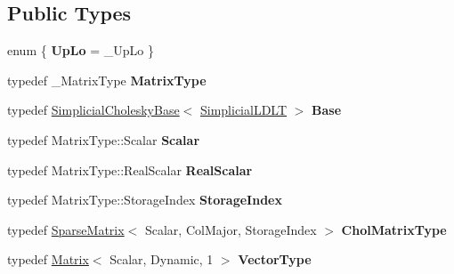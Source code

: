 \subsection*{Public Types}
\begin{DoxyCompactItemize}
\item 
\mbox{\label{class_eigen_1_1_simplicial_l_d_l_t_af38a3d21ce43cfccc068374e98404c4f}} 
enum \{ {\bfseries Up\+Lo} = \+\_\+\+Up\+Lo
 \}
\item 
\mbox{\label{class_eigen_1_1_simplicial_l_d_l_t_a75c4a9713dc57cea09c05185a93398b6}} 
typedef \+\_\+\+Matrix\+Type {\bfseries Matrix\+Type}
\item 
\mbox{\label{class_eigen_1_1_simplicial_l_d_l_t_a80564e6741d039a3b7b2b71a96639678}} 
typedef \mbox{\hyperlink{class_eigen_1_1_simplicial_cholesky_base}{Simplicial\+Cholesky\+Base}}$<$ \mbox{\hyperlink{class_eigen_1_1_simplicial_l_d_l_t}{Simplicial\+L\+D\+LT}} $>$ {\bfseries Base}
\item 
\mbox{\label{class_eigen_1_1_simplicial_l_d_l_t_a95c4c66916a223d1b9ab67ef1f40ddea}} 
typedef Matrix\+Type\+::\+Scalar {\bfseries Scalar}
\item 
\mbox{\label{class_eigen_1_1_simplicial_l_d_l_t_a2d8d8a511f80f5fc755ec719d8ec468f}} 
typedef Matrix\+Type\+::\+Real\+Scalar {\bfseries Real\+Scalar}
\item 
\mbox{\label{class_eigen_1_1_simplicial_l_d_l_t_a653560f255aa6cf3a3c01bf0cb33efcd}} 
typedef Matrix\+Type\+::\+Storage\+Index {\bfseries Storage\+Index}
\item 
\mbox{\label{class_eigen_1_1_simplicial_l_d_l_t_aefb2fe5145c99758a17687e0b46b6984}} 
typedef \mbox{\hyperlink{class_eigen_1_1_sparse_matrix}{Sparse\+Matrix}}$<$ Scalar, Col\+Major, Storage\+Index $>$ {\bfseries Chol\+Matrix\+Type}
\item 
\mbox{\label{class_eigen_1_1_simplicial_l_d_l_t_a46600ac1a333de3d432e3aa0a9c6ce4d}} 
typedef \mbox{\hyperlink{class_eigen_1_1_matrix}{Matrix}}$<$ Scalar, Dynamic, 1 $>$ {\bfseries Vector\+Type}

\end{DoxyCompactItemize}
